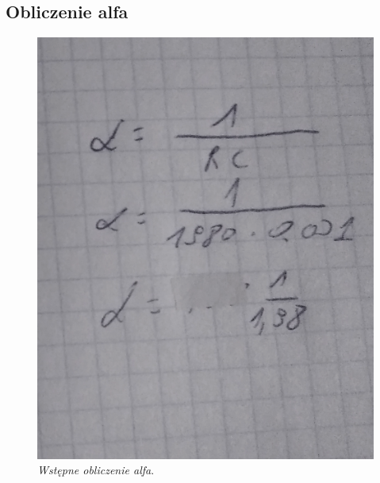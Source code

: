 \documentclass[12pt,oneside,a4paper]{book} %
\begin{document}








\subsection{Obliczenie alfa}

\begin{figure}[h]
\begin{center} 

\includegraphics[scale=0.7]{./images/02.PNG}

\caption{\textit{Wstępne obliczenie alfa}.\newline }
\label{rys:logoup}
\end{center}
\end{figure}
\end{document}

